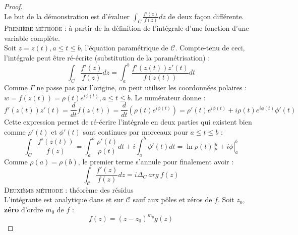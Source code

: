 

\begin{proof}\ \\
	Le but de la démonstration est d'évaluer $\int_C \frac{f'(z)}{f(z)}dz$ de deux façon différente.\\
	\textsc{Première méthode :} à partir de la définition de l'intégrale d'une fonction d'une
	variable complète.\\
	Soit $z=z(t), a\leq t\leq b$, l'équation paramétrique de $\mathcal{C}$. Compte-tenu de
	ceci, l'intégrale peut \^etre ré-écrite (substitution de la paramétrisation) :
	\begin{equation}
		\int_C\frac{f'(z)}{f(z)}dz = \int_a^b \frac{f'(z(t))z'(t)}{f(z(t))}dt
	\end{equation}
	Comme $\Gamma$ ne passe pas par l'origine, on peut utiliser les coordonnées polaires :
	$w = f(z(t)) = \rho(t)e^{i\phi(t)}, a\leq t\leq b$. Le numérateur donne :
	\begin{equation}
		f'(z(t))z'(t) = \frac{d}{dt}f(z(t)) = \frac{d}{dt}(\rho(t)e^{i\phi(t)}) = \rho'(t)e^{i
			\phi(t)} + i\rho(t)e^{i\phi(t)}\phi'(t)
	\end{equation}
	Cette expression permet de ré-écrire l'intégrale en deux parties qui existent bien comme 
	$\rho'(t)$ et $\phi'(t)$ sont continues par morceaux pour $a\leq t \leq b$ :
	\begin{equation}
		\int_C\frac{f'(z(t))}{f(z)} = \int_a^b \frac{\rho'(t)}{\rho(t)}dt + i\int_a^b \phi'(t)dt
		= \ln\rho(t)|_a^b + i\phi|_a^b
	\end{equation}
	Comme $\rho(a)=\rho(b)$, le premier terme s'annule pour finalement avoir :
	\begin{equation}
		\int_\mathcal{C} \frac{f'(z)}{f(z)}dz = i\Delta_C\ arg\ f(z)
	\end{equation}
	\textsc{Deuxième méthode} : théorème des résidus\\
	L'intégrante est analytique dans et sur $\mathcal{C}$ sauf aux pôles et zéros de $f$. Soit
	$z_0$, \textbf{zéro} d'ordre $m_0$ de $f$ :
	\begin{equation}
		f(z) = (z-z_0)^{m_0}g(z)
	\end{equation}

\end{proof}
